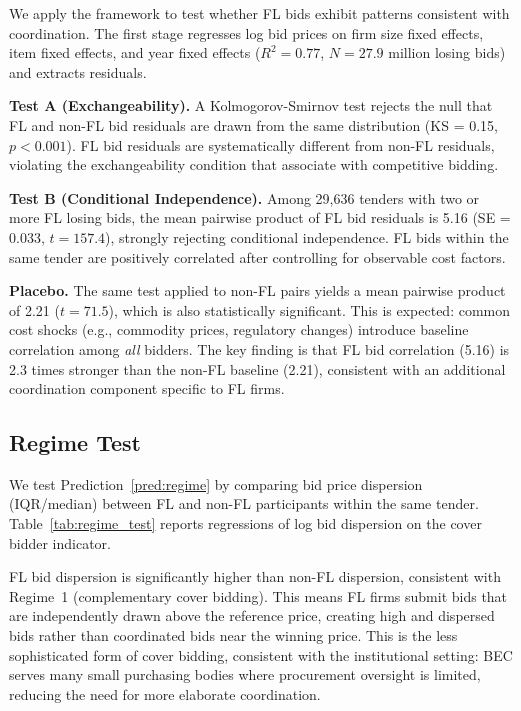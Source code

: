 \documentclass[12pt]{elsarticle}
\begin{document}
We apply the \citet{bajari2003deciding} framework to test whether FL bids exhibit patterns consistent with coordination. The first stage regresses log bid prices on firm size fixed effects, item fixed effects, and year fixed effects ($R^2 = 0.77$, $N = 27.9$ million losing bids) and extracts residuals.

\textbf{Test A (Exchangeability).} A Kolmogorov-Smirnov test rejects the null that FL and non-FL bid residuals are drawn from the same distribution (KS = 0.15, $p < 0.001$). FL bid residuals are systematically different from non-FL residuals, violating the exchangeability condition that \citet{bajari2003deciding} associate with competitive bidding.

\textbf{Test B (Conditional Independence).} Among 29,636 tenders with two or more FL losing bids, the mean pairwise product of FL bid residuals is 5.16 (SE = 0.033, $t = 157.4$), strongly rejecting conditional independence. FL bids within the same tender are positively correlated after controlling for observable cost factors.

\textbf{Placebo.} The same test applied to non-FL pairs yields a mean pairwise product of 2.21 ($t = 71.5$), which is also statistically significant. This is expected: common cost shocks (e.g., commodity prices, regulatory changes) introduce baseline correlation among \textit{all} bidders. The key finding is that FL bid correlation (5.16) is 2.3 times stronger than the non-FL baseline (2.21), consistent with an additional coordination component specific to FL firms.



\subsection{Regime Test}

We test Prediction~\ref{pred:regime} by comparing bid price dispersion (IQR/median) between FL and non-FL participants within the same tender. Table~\ref{tab:regime_test} reports regressions of log bid dispersion on the cover bidder indicator.

FL bid dispersion is significantly higher than non-FL dispersion, consistent with Regime~1 (complementary cover bidding). This means FL firms submit bids that are independently drawn above the reference price, creating high and dispersed bids rather than coordinated bids near the winning price. This is the less sophisticated form of cover bidding, consistent with the institutional setting: BEC serves many small purchasing bodies where procurement oversight is limited, reducing the need for more elaborate coordination.
\end{document}
